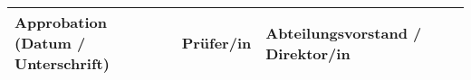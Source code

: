 \vspace{0.5cm}

\begin{tabular}{|p{5.3cm}|p{5.28cm}|p{5.29cm}|@{}m{0cm}@{}}
\hline
\vspace{-0.6cm}Approbation \newline (Datum / Unterschrift) & \vspace{-1.1cm} Prüfer/in & \vspace{-1.1cm} Abteilungsvorstand / \newline Direktor/in & \\ [1.9cm]
\hline
\end{tabular}